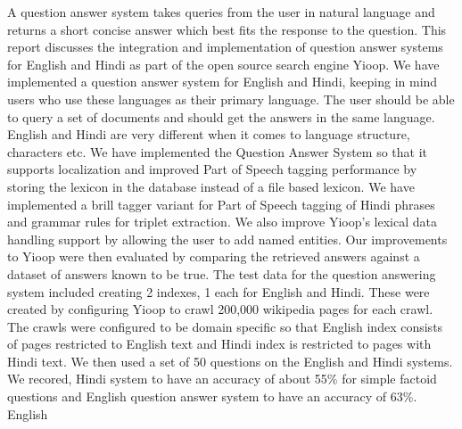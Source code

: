 A question answer system takes queries from the user in natural language and returns a short concise answer which best fits the response to the question. This report discusses the integration and implementation of question answer systems for English and Hindi as part of the  open source search engine Yioop. We have implemented a question answer system for English and Hindi, keeping in mind users who use these languages as their primary language. The user should be able to query a set of  documents and should get the answers in the same language. English and Hindi are very different when it comes to language structure, characters etc. We have implemented the Question Answer System so that it supports localization and improved Part of Speech tagging performance by storing the lexicon in the database instead of a file based lexicon. We have implemented a brill tagger variant for Part of Speech tagging of Hindi phrases and grammar rules for triplet extraction. We also improve Yioop's lexical data handling support by allowing the user to add named entities. Our improvements to Yioop were then evaluated by comparing the retrieved answers against a dataset of answers known to be true. 
The test data for the question answering system included creating 2 indexes, 1 each for English and Hindi. These were created by configuring Yioop to crawl 200,000 wikipedia pages for each crawl. The crawls were configured to be domain specific so that English index consists of pages restricted to English text and Hindi index is restricted to pages with Hindi text. We then used a set of 50 questions on the English and Hindi systems. We recored, Hindi system to have an accuracy of about 55\% for simple factoid questions and English question answer system to have an accuracy of 63\%. 
English